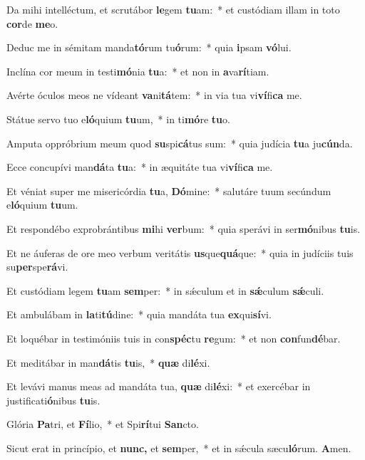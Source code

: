 \item Da mihi intelléctum, et scrutábor \textbf{le}gem \textbf{tu}am:~* et custódiam illam in toto \textbf{cor}de \textbf{me}o.
\item Deduc me in sémitam manda\textbf{tó}rum tu\textbf{ó}rum:~* quia \textbf{i}psam \textbf{vó}lui.
\item Inclína cor meum in testi\textbf{mó}nia \textbf{tu}a:~* et non in \textbf{a}va\textbf{rí}tiam.
\item Avérte óculos meos ne vídeant \textbf{va}ni\textbf{tá}tem:~* in via tua vi\textbf{ví}fi\textbf{ca} me.
\item Státue servo tuo e\textbf{ló}quium \textbf{tu}um,~* in ti\textbf{mó}re \textbf{tu}o.
\item Amputa oppróbrium meum quod \textbf{su}spi\textbf{cá}tus sum:~* quia judícia \textbf{tu}a ju\textbf{cún}da.
\item Ecce concupívi man\textbf{dá}ta \textbf{tu}a:~* in æquitáte tua vi\textbf{ví}fi\textbf{ca} me.
\item Et véniat super me misericórdia \textbf{tu}a, \textbf{Dó}mine:~* salutáre tuum secúndum e\textbf{ló}quium \textbf{tu}um.
\item Et respondébo exprobrántibus \textbf{mi}hi \textbf{ver}bum:~* quia sperávi in ser\textbf{mó}nibus \textbf{tu}is.
\item Et ne áuferas de ore meo verbum veritátis \textbf{us}que\textbf{quá}que:~* quia in judíciis tuis su\textbf{per}spe\textbf{rá}vi.
\item Et custódiam legem \textbf{tu}am \textbf{sem}per:~* in sǽculum et in \textbf{sǽ}culum \textbf{sǽ}culi.
\item Et ambulábam in \textbf{la}ti\textbf{tú}dine:~* quia mandáta tua \textbf{ex}qui\textbf{sí}vi.
\item Et loquébar in testimóniis tuis in con\textbf{spéc}tu \textbf{re}gum:~* et non \textbf{con}fun\textbf{dé}bar.
\item Et meditábar in man\textbf{dá}tis \textbf{tu}is,~* \textbf{quæ} di\textbf{lé}xi.
\item Et levávi manus meas ad mandáta tua, \textbf{quæ} di\textbf{lé}xi:~* et exercébar in justificati\textbf{ó}nibus \textbf{tu}is.
\item Glória \textbf{Pa}tri, et \textbf{Fí}lio,~* et Spi\textbf{rí}tui \textbf{San}cto.
\item Sicut erat in princípio, et \textbf{nunc,} et \textbf{sem}per,~* et in sǽcula sæcu\textbf{ló}rum. \textbf{A}men.
